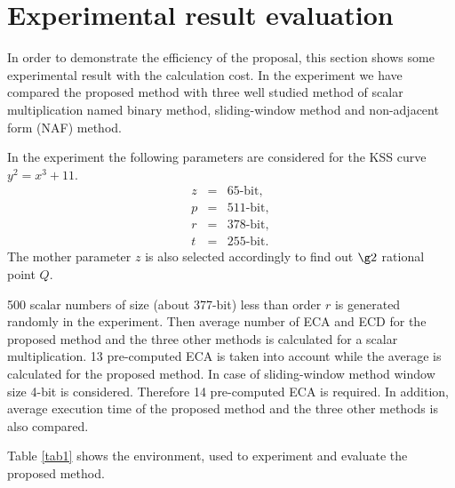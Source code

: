 \section{Experimental result evaluation}
In order to demonstrate the efficiency of the proposal, this section shows some experimental result with the calculation cost. In the experiment we have compared the proposed method with three well studied method of scalar multiplication named binary method, sliding-window method and non-adjacent form (NAF) method.

In the experiment the following parameters are considered for the KSS curve $y^2 = x^3 + 11$. 
\begin{eqnarray}
z & = & 65   \mbox{-bit},  \nonumber \\ 
p  & = & 511 \mbox{-bit},  \nonumber \\ 
r  & = & 378 \mbox{-bit} ,\nonumber \\ 
t  & = & 255  \mbox{-bit}. \nonumber
\end{eqnarray}
The mother parameter $z$ is also selected accordingly to find out $\g2$ rational point $Q$. 

500 scalar numbers of size (about 377-bit) less than order $r$ is generated randomly in the experiment. Then average number of ECA and ECD for the proposed method and the three other methods is calculated for a scalar multiplication. 13  pre-computed ECA is taken into account while the average is calculated for the proposed method. In case of sliding-window method window size 4-bit is considered. Therefore 14 pre-computed ECA is required. In addition, average execution time of the proposed method and the three other methods is also compared.

Table \ref{tab1} shows the environment, used to experiment and evaluate the proposed method.  
\renewcommand{\baselinestretch}{1.5}
\begin{table}[!ht]
\renewcommand{\arraystretch}{1.3}
\centering
\caption{ Computational Environment}
\label{tab1}
\end{table}
\renewcommand{\baselinestretch}{1.0}

